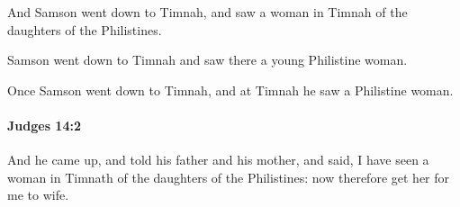 			\begin{versebox}
					\item[BHS] 
					\item[ASV] And Samson went down to Timnah, and saw a woman in Timnah of the daughters of the Philistines.
					\item[NIV] Samson went down to Timnah and saw there a young Philistine woman.
					\item[NRSV] Once Samson went down to Timnah, and at Timnah he saw a Philistine woman.
			\end{versebox}

		\paragraph{Judges 14:2} %
			\label{JUDGES-14-2}

			And he came up, and told his father and his mother, and said, I have seen a woman in Timnath of the daughters of the Philistines: now therefore get her for me to wife.

